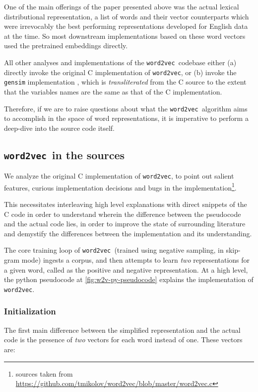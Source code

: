 \documentclass[11pt]{book}
\newcommand{\wtov}{\texttt{word2vec }}
\begin{document}
One of the main offerings of the paper presented above was the actual lexical
distributional representation, a list of words and their vector counterparts
which were irrevocably the best performing representations developed for English
data at the time. So most downstream implementations based on these word vectors
used the pretrained embeddings directly. 

All other analyses and implementations of the \wtov codebase either (a) directly
invoke the original C implementation of \texttt{word2vec},
or (b) invoke the \texttt{gensim} implementation \cite{vrehuuvrek2011gensim},
which is \emph{transliterated} from the C source to the extent
that the variables names are the same as that of the C implementation.

Therefore, if we are to raise questions about what the \wtov algorithm aims to
accomplish in the space of word representations, it is imperative to perform a
deep-dive into the source code itself.

\subsection{\wtov in the sources}

We analyze the original C implementation of \texttt{word2vec}, to point out
salient features, curious implementation decisions and bugs in the
implementation\footnote{sources taken from
\url{https://github.com/tmikolov/word2vec/blob/master/word2vec.c}}.

This necessitates interleaving high level explanations with direct snippets of
the C code in order to understand wherein the difference between the pseudocode
and the actual code lies, in order to improve the state of surrounding
literature and demystify the differences between the implementation and its
understanding.

The core training loop of \wtov (trained using negative sampling, in skip-gram mode)
ingests a corpus, and then attempts to learn \emph{two} representations for a
given word, called as the positive and negative representation. At a high
level, the python pseudocode at \autoref{fig:w2v-py-pseudocode} explains the
implementation of \texttt{word2vec}.


\subsubsection{Initialization}

The first main difference between the simplified representation and the actual
code is the presence of \textit{two} vectors for each word instead of one. These
vectors are:
\end{document}
